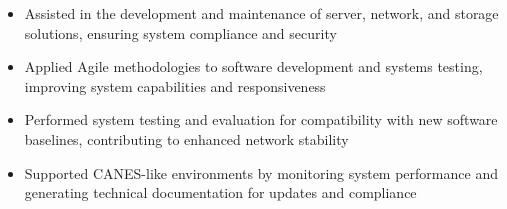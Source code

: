 \par\smallskip
\noindent
\begin{minipage}{20cm}
  \begin{minipage}{9.75cm}
    \begin{itemize}
      \item Assisted in the development and maintenance of server, network, and storage solutions, ensuring system compliance and security
      \item Applied Agile methodologies to software development and systems testing, improving system capabilities and responsiveness
    \end{itemize}
  \end{minipage}
  \hfill
  \begin{minipage}{9.75cm}
    \begin{itemize}
      \item Performed system testing and evaluation for compatibility with new software baselines, contributing to enhanced network stability
      \item Supported CANES-like environments by monitoring system performance and generating technical documentation for updates and compliance
    \end{itemize}
  \end{minipage}
\end{minipage}
\par\smallskip
\divider

